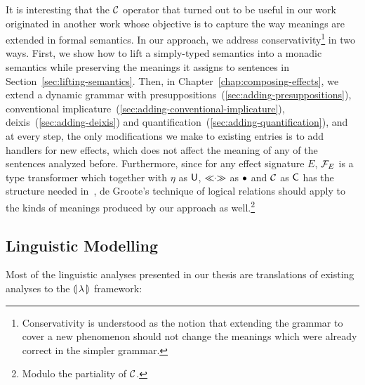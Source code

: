 It is interesting that the $\mathcal{C}$ operator that turned out to be useful in
our work originated in another work whose objective is to capture the way
meanings are extended in formal semantics. In our approach, we address
conservativity\footnote{Conservativity is understood as the notion that
  extending the grammar to cover a new phenomenon should not change the
  meanings which were already correct in the simpler grammar.} in two
ways. First, we show how to lift a simply-typed semantics into a monadic
semantics while preserving the meanings it assigns to sentences in
Section~\ref{sec:lifting-semantics}. Then, in
Chapter~\ref{chap:composing-effects}, we extend a dynamic grammar with
presuppositions~(\ref{sec:adding-presuppositions}), conventional
implicature~(\ref{sec:adding-conventional-implicature}),
deixis~(\ref{sec:adding-deixis}) and
quantification~(\ref{sec:adding-quantification}), and at every step, the
only modifications we make to existing entries is to add handlers for new
effects, which does not affect the meaning of any of the sentences analyzed
before. Furthermore, since for any effect signature $E$, $\mathcal{F}_E$ is a type
transformer which together with $\eta$ as $\textsf{U}$, $\mathbin{\ll\!\!\cdot\!\!\gg}$ as $\mathbin{\bullet}$ and
$\mathcal{C}$ as $\textsf{C}$ has the structure needed
in~\cite{degroote2015conservativity}, de Groote's technique of logical
relations should apply to the kinds of meanings produced by our approach as
well.\footnote{Modulo the partiality of $\mathcal{C}$.}


\subsection{Linguistic Modelling}
\label{ssec:comparison-linguistic}

Most of the linguistic analyses presented in our thesis are translations of
existing analyses to the ${\llparenthesis \, \lambda \, \rrparenthesis}$ framework:

